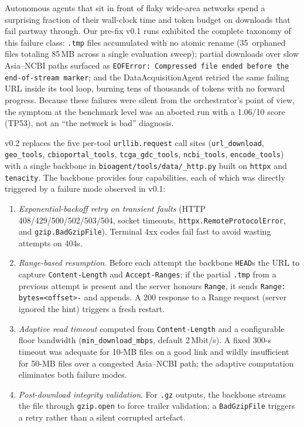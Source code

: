 \documentclass[11pt]{article}
\begin{document}
Autonomous agents that sit in front of flaky wide-area networks spend a
surprising fraction of their wall-clock time and token budget on
downloads that fail partway through.
Our pre-fix v0.1 runs exhibited the complete taxonomy of this failure
class: \texttt{.tmp} files accumulated with no atomic rename
(35~orphaned files totaling 85\,MB across a single evaluation sweep);
partial downloads over slow Asia--NCBI paths surfaced as
\texttt{EOFError: Compressed file ended before the end-of-stream
marker}; and the DataAcquisitionAgent retried the same failing URL
inside its tool loop, burning tens of thousands of tokens with no
forward progress.
Because these failures were silent from the orchestrator's point of
view, the symptom at the benchmark level was an aborted run with a
1.06/10 score (TP53), not an ``the network is bad'' diagnosis.

v0.2 replaces the five per-tool \texttt{urllib.request} call sites
(\texttt{url\_download}, \texttt{geo\_tools}, \texttt{cbioportal\_tools},
\texttt{tcga\_gdc\_tools}, \texttt{ncbi\_tools}, \texttt{encode\_tools})
with a single backbone in \texttt{bioagent/tools/data/\_http.py} built
on \texttt{httpx} and \texttt{tenacity}.
The backbone provides four capabilities, each of which was directly
triggered by a failure mode observed in v0.1:

\begin{enumerate}
  \item \textit{Exponential-backoff retry on transient faults}
        (HTTP 408/429/500/502/503/504, socket timeouts,
        \texttt{httpx.RemoteProtocolError}, and
        \texttt{gzip.BadGzipFile}). Terminal 4xx codes fail fast to
        avoid wasting attempts on 404s.
  \item \textit{Range-based resumption}. Before each attempt the
        backbone \texttt{HEAD}s the URL to capture
        \texttt{Content-Length} and \texttt{Accept-Ranges}; if the
        partial \texttt{.tmp} from a previous attempt is present and
        the server honours \texttt{Range}, it sends
        \texttt{Range: bytes=<offset>-} and appends. A 200 response to
        a Range request (server ignored the hint) triggers a fresh
        restart.
  \item \textit{Adaptive read timeout} computed from
        \texttt{Content-Length} and a configurable floor bandwidth
        (\texttt{min\_download\_mbps}, default 2\,Mbit/s).
        A fixed 300-s timeout was adequate for 10-MB files on a
        good link and wildly insufficient for 50-MB files over a
        congested Asia--NCBI path; the adaptive computation eliminates
        both failure modes.
  \item \textit{Post-download integrity validation}. For \texttt{.gz}
        outputs, the backbone streams the file through
        \texttt{gzip.open} to force trailer validation; a
        \texttt{BadGzipFile} triggers a retry rather than a silent
        corrupted artefact.
\end{enumerate}
\end{document}
